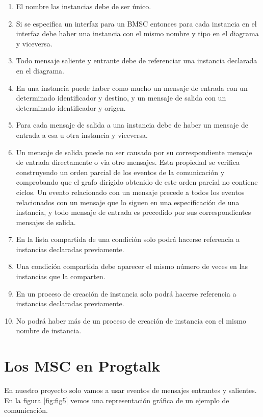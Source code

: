 \begin{enumerate}
\item El nombre las instancias debe de ser único.
\item Si se especifica un interfaz para un BMSC entonces para cada
instancia en el interfaz debe haber una instancia con el mismo 
nombre y tipo en el diagrama y viceversa.
\item Todo mensaje saliente y entrante debe de referenciar una
instancia declarada en el diagrama.
\item En una instancia puede haber como mucho un mensaje de entrada
con un determinado identificador y destino, y un mensaje de salida con
un determinado identificador y origen.
\item Para cada mensaje de salida a una instancia debe de haber un 
mensaje de entrada a esa u otra instancia y viceversa.
\item Un mensaje de salida puede no ser causado por su correspondiente
mensaje de entrada directamente o via otro mensajes.     
Esta propiedad se verifica construyendo un orden parcial de los 
eventos de la comunicación y comprobando que el grafo dirigido 
obtenido de este orden parcial no contiene ciclos. Un evento
relacionado con un mensaje precede a todos los eventos relacionados
con un mensaje que lo siguen en una especificación de una instancia,
y todo mensaje de entrada es precedido por sus correspondientes 
mensajes de salida.
\item En la lista compartida de una condición solo podrá hacerse
referencia a instancias declaradas previamente.
\item Una condición compartida debe aparecer el mismo número de
veces en las instancias que la comparten.
\item En un proceso de creación de instancia solo podrá hacerse
referencia a instancias declaradas previamente.
\item No podrá haber más de un proceso de creación de instancia con
el mismo nombre de instancia.
\end{enumerate}

\section{Los MSC en Progtalk}
En nuestro proyecto solo vamos a usar eventos de mensajes entrantes y
salientes. En la figura \ref{fig:fig5} vemos una representación
gráfica de un ejemplo de comunicación.

